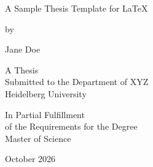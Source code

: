 

\begin{titlepage}
	\thispagestyle{empty}
	\makeatletter
	\centering

	\vspace*{2.1cm}
	{\Large\bfseries
		\begin{minipage}{0.88\textwidth}
			\centering
			A Sample Thesis Template for LaTeX
		\end{minipage}\par}

  \vfill

	{\normalsize by\par}
	\vspace{0.15cm}
	{\normalsize Jane Doe \par}

	\vfill

	{\normalsize A Thesis \\ Submitted to the Department of XYZ \\ Heidelberg University \par}

	\vspace{0.5cm}

	{\normalsize In Partial Fulfillment \\ of the Requirements for the Degree \\ Master of Science\par}
  \vspace{0.5cm}
	{\normalsize October 2026\par}

	\makeatother
\end{titlepage}


\cleardoublepage